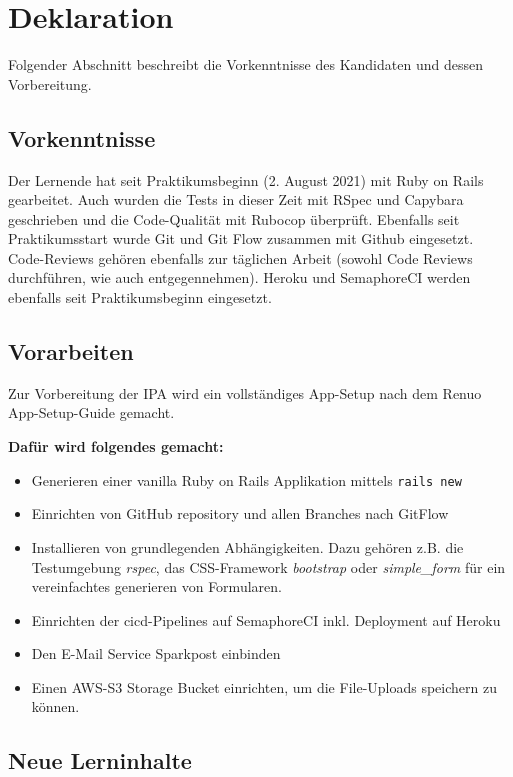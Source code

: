 \chapter{Deklaration}

Folgender Abschnitt beschreibt die Vorkenntnisse des Kandidaten und dessen Vorbereitung.

\section{Vorkenntnisse}

Der Lernende hat seit Praktikumsbeginn (2. August 2021) mit Ruby on Rails gearbeitet. Auch wurden die Tests in dieser Zeit mit RSpec und Capybara geschrieben und die Code-Qualität mit Rubocop überprüft.
Ebenfalls seit Praktikumsstart wurde Git und Git Flow zusammen mit Github eingesetzt. Code-Reviews gehören ebenfalls zur täglichen Arbeit (sowohl Code Reviews durchführen, wie auch entgegennehmen).
Heroku und SemaphoreCI werden ebenfalls seit Praktikumsbeginn eingesetzt.

\section{Vorarbeiten}

Zur Vorbereitung der IPA wird ein vollständiges App-Setup nach dem Renuo App-Setup-Guide gemacht.

\textbf{Dafür wird folgendes gemacht:}
\begin{itemize}
    \item Generieren einer vanilla Ruby on Rails Applikation mittels \texttt{rails new}
    \item Einrichten von GitHub repository und allen Branches nach GitFlow
    \item Installieren von grundlegenden Abhängigkeiten. Dazu gehören z.B. die Testumgebung \emph{rspec},
          das CSS-Framework \emph{bootstrap} oder \emph{simple\_form} für ein vereinfachtes generieren von Formularen.
    \item Einrichten der \gls{cicd}-Pipelines auf SemaphoreCI inkl. Deployment auf Heroku
    \item Den E-Mail Service Sparkpost einbinden
    \item Einen AWS-S3 Storage Bucket einrichten, um die File-Uploads speichern zu können.
\end{itemize}

\section{Neue Lerninhalte}

